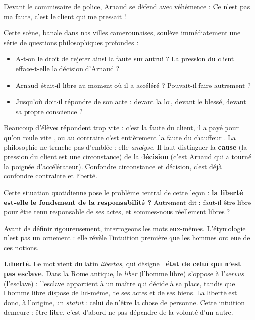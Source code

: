 \documentclass[11pt]{article}
\newcommand{\cle}[1]{{\popxbold\color{popdark}#1}}
\newcounter{popsec}
\newcounter{popsub}
\newcommand{\courssub}[1]{%
  \stepcounter{popsub}%
  \par\vspace{9pt}\noindent{\popxbold\fontsize{11.5}{13}\selectfont\color{popink}{\color{poporange}\thepopsec.\thepopsub}\hspace{6pt}#1}\par\nopagebreak\vspace{4pt}
}
\begin{document}
Devant le commissaire de police, Arnaud se défend avec véhémence : \og Ce n'est pas ma faute, c'est le client qui me pressait ! \fg{}

Cette scène, banale dans nos villes camerounaises, soulève immédiatement une série de questions philosophiques profondes :

\begin{itemize}
\item A-t-on le \cle{droit} de rejeter ainsi la faute sur autrui ? La pression du client efface-t-elle la décision d'Arnaud ?
\item Arnaud était-il \cle{libre} au moment où il a accéléré ? Pouvait-il faire autrement ?
\item Jusqu'où doit-il \cle{répondre} de son acte : devant la loi, devant le blessé, devant sa propre conscience ?
\end{itemize}

\begin{attention}
Beaucoup d'élèves répondent trop vite : \og c'est la faute du client, il a payé pour qu'on roule vite \fg{}, ou au contraire \og c'est entièrement la faute du chauffeur \fg{}. La philosophie ne tranche pas d'emblée : elle \emph{analyse}. Il faut distinguer la \textbf{cause} (la pression du client est une circonstance) de la \textbf{décision} (c'est Arnaud qui a tourné la poignée d'accélérateur). Confondre circonstance et décision, c'est déjà confondre contrainte et liberté.
\end{attention}

Cette situation quotidienne pose le problème central de cette leçon : \textbf{la liberté est-elle le fondement de la responsabilité ?} Autrement dit : faut-il être libre pour être tenu responsable de ses actes, et sommes-nous réellement libres ?

\courssub{Étymologie des deux concepts}

Avant de définir rigoureusement, interrogeons les mots eux-mêmes. L'étymologie n'est pas un ornement : elle révèle l'intuition première que les hommes ont eue de ces notions.

\textbf{Liberté.} Le mot vient du latin \emph{libertas}, qui désigne l'\textbf{état de celui qui n'est pas esclave}. Dans la Rome antique, le \emph{liber} (l'homme libre) s'oppose à l'\emph{servus} (l'esclave) : l'esclave appartient à un maître qui décide à sa place, tandis que l'homme libre dispose de lui-même, de ses actes et de ses biens. La liberté est donc, à l'origine, un \emph{statut} : celui de n'être la chose de personne. Cette intuition demeure : être libre, c'est d'abord ne pas dépendre de la volonté d'un autre.
\end{document}
